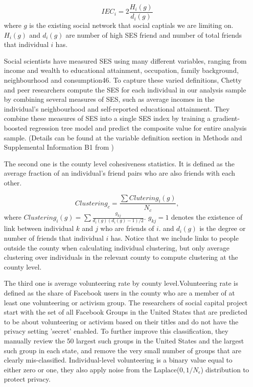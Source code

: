 \documentclass{article}
\begin{document}
$$IEC_i=2\frac{H_i(g)}{d_i(g)}$$ where $g$ is the existing social network that social captials we are limiting on. $H_i(g)$ and $d_i(g)$ are number of high SES friend and number of total friends that individual $i$ has.

Social scientists have measured SES using many different variables, ranging from income and wealth to educational attainment, occupation, family background, neighbourhood and consumption46. To capture these varied definitions, Chetty and peer researchers compute the SES for each individual in our analysis sample by combining several measures of SES, such as average incomes in the individual’s neighbourhood and self-reported educational attainment. They combine these measures of SES into a single SES index by training a gradient-boosted regression tree model and predict the composite value for entire analysis sample. (Details can be found at the variable definition section in Methods and Supplemental Information B1 from \cite{chetty2022social1})

The second one is the county level cohesiveness statistics. It is defined as the average fraction of an individual's friend pairs who are also friends with each other.

$$Clustering_c=\frac{\sum{Clutering_i(g)}}{N_c},$$
where $Clustering_i(g)=\sum{\frac{g_{kj}}{d_i(g)(d_i(g)-1)/2}}$. $g_{kj}=1$ denotes the existence of link between individual $k$ and $j$ who are friends of $i$. and $d_i(g)$ is the degree or number of friends that individual $i$ has. Notice that we include links to people outside the county when calculating individual clustering, but only average clustering
over individuals in the relevant county to compute clustering at the
county level.

The third one is average volunteering rate by county level.Volunteering rate is defined as the share of Facebook users in the county who are a member of at least one volunteering or activism group. The researchers of social capital project start with the set of all Facebook Groups in the United States that are predicted to be about volunteering or activism based on their titles and do not have the privacy setting 'secret' enabled. To further improve this classification, they manually review the 50 largest such groups in the United States and the largest such group in each state, and remove the very small number of groups that are clearly mis-classified. Individual-level volunteering is a binary value equal to either zero or one, they also apply noise from the Laplace($0, 1/N_\epsilon$) distribution to protect privacy.
\end{document}
